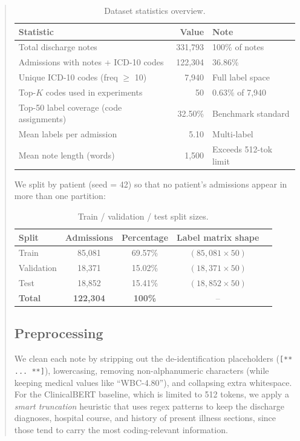 \documentclass[11pt,a4paper]{article}
\begin{document}
\begin{abstract}
\begin{table}[H]
\centering
\caption{Dataset statistics overview.}
\label{tab:data_stats}
\small
\begin{tabular}{lrl}
\toprule
\textbf{Statistic} & \textbf{Value} & \textbf{Note} \\
\midrule
Total discharge notes                      & 331,793 & 100\% of notes \\
Admissions with notes + ICD-10 codes       & 122,304 & 36.86\% \\
Unique ICD-10 codes (freq $\geq$ 10)      & 7,940   & Full label space \\
Top-$K$ codes used in experiments          & 50      & 0.63\% of 7,940 \\
Top-50 label coverage (code assignments)   & 32.50\% & Benchmark standard \\
Mean labels per admission                  & 5.10    & Multi-label \\
Mean note length (words)                   & 1,500   & Exceeds 512-tok limit \\
\bottomrule
\end{tabular}
\end{table}

We split by patient (seed = 42) so that no patient's admissions appear in more than one partition:

\begin{table}[H]
\centering
\caption{Train / validation / test split sizes.}
\label{tab:split}
\small
\begin{tabular}{lcccc}
\toprule
\textbf{Split} & \textbf{Admissions} & \textbf{Percentage} & \textbf{Label matrix shape} \\
\midrule
Train      & 85,081  & 69.57\% & $(85{,}081 \times 50)$ \\
Validation & 18,371  & 15.02\% & $(18{,}371 \times 50)$ \\
Test       & 18,852  & 15.41\% & $(18{,}852 \times 50)$ \\
\midrule
\textbf{Total} & \textbf{122,304} & \textbf{100\%} & -- \\
\bottomrule
\end{tabular}
\end{table}

\subsection{Preprocessing}
We clean each note by stripping out the de-identification placeholders (\texttt{[** ... **]}), lowercasing, removing non-alphanumeric characters (while keeping medical values like ``WBC-4.80''), and collapsing extra whitespace. For the ClinicalBERT baseline, which is limited to 512 tokens, we apply a \emph{smart truncation} heuristic that uses regex patterns to keep the discharge diagnoses, hospital course, and history of present illness sections, since those tend to carry the most coding-relevant information.


\end{abstract}
\end{document}
